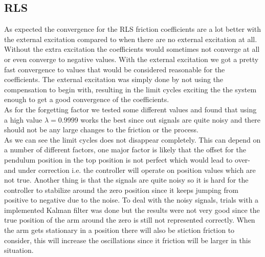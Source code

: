 \documentclass[10pt,a4paper]{article}
\begin{document}
\subsection{RLS}
As expected the convergence for the RLS friction coefficients are a lot better with the external excitation compared to when there are no external excitation at all. Without the extra excitation the coefficients would sometimes not converge at all or even converge to negative values. With the external excitation we got a pretty fast convergence to values that would be considered reasonable for the coefficients. The external excitation was simply done by not using the compensation to begin with, resulting in the limit cycles exciting the the system enough to get a good convergence of the coefficients.\\

As for the forgetting factor we tested some different values and found that using a high value $\lambda = 0.9999$ works the best since out signals are quite noisy and there should not be any large changes to the friction or the process. 
\\
As we can see the limit cycles does not disappear completely. This can depend on a number of different factors, one major factor is likely that the offset for the pendulum position in the top position is not perfect which would lead to over- and under correction i.e. the controller will operate on position values which are not true. Another thing is that the signals are quite noisy so it is hard for the controller to stabilize around the zero position since it keeps jumping from positive to negative due to the noise. To deal with the noisy signals, trials with a implemented Kalman filter was done but the results were not very good since the true position of the arm around the zero is still not represented correctly. When the arm gets stationary in a position there will also be stiction friction to consider, this will increase the oscillations since it friction will be larger in this situation.
\end{document}
